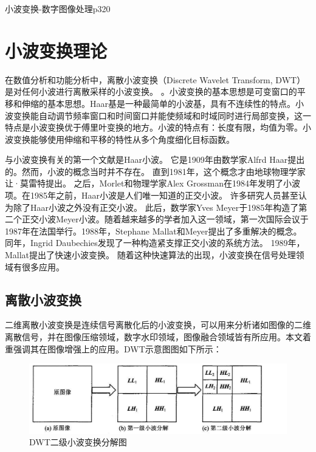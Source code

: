 \documentclass[12pt]{book}
\begin{document}
		小波变换-数字图像处理p320
		\section{小波变换理论}在数值分析和功能分析中，离散小波变换（Discrete Wavelet Transform, DWT）是对任何小波进行离散采样的小波变换。 。小波变换的基本思想是可变窗口的平移和伸缩的基本思想。Haar基是一种最简单的小波基，具有不连续性的特点。小波变换能自动调节频率窗口和时间窗口并能使频域和时域同时进行局部变换，这一特点是小波变换优于傅里叶变换的地方。小波的特点有：长度有限，均值为零。小波变换能够使用伸缩和平移的特性从多个角度细化目标函数。

与小波变换有关的第一个文献是Haar小波。 它是1909年由数学家Alfrd Haar提出的。然而，小波的概念当时并不存在。 直到1981年，这个概念才由地球物理学家让·莫雷特提出。 之后，Morlet和物理学家Alex Grossman在1984年发明了小波项。在1985年之前，Haar小波是人们唯一知道的正交小波。 许多研究人员甚至认为除了Haar小波之外没有正交小波。 此后，数学家Yves Meyer于1985年构造了第二个正交小波Meyer小波。随着越来越多的学者加入这一领域，第一次国际会议于1987年在法国举行。1988年，Stephane Mallat和Meyer提出了多重解决的概念。 同年，Ingrid Daubechies发现了一种构造紧支撑正交小波的系统方法。 1989年，Mallat提出了快速小波变换。 随着这种快速算法的出现，小波变换在信号处理领域有很多应用。
			\subsection{离散小波变换}二维离散小波变换是连续信号离散化后的小波变换，可以用来分析诸如图像的二维离散信号，并在图像压缩领域，数字水印领域，图像融合领域皆有所应用。本文着重强调其在图像增强上的应用。DWT示意图图如下所示：
				\begin{figure}[!ht]\centering
					\includegraphics[totalheight=40mm,width=160mm]{./figures/DWT.jpg}
					\caption{DWT二级小波变换分解图\label{DWT}}	
				\end{figure}		
\end{document}

